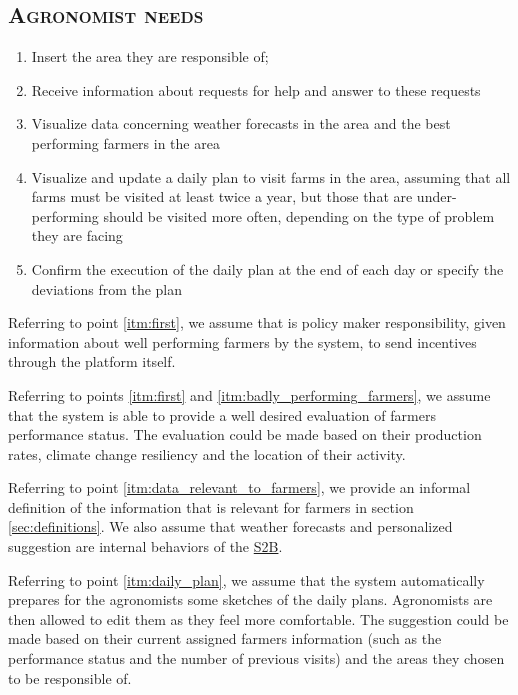 \subsection*{\textsc{\textcolor{myblue}{Agronomist needs}}}
\label{sec:agronomistsNeeds}
    \begin{enumerate}[resume]
        \item Insert the area they are responsible of;
        \item Receive information about requests for help and answer to these requests
        \item Visualize data concerning weather forecasts in the area and the best performing farmers in the area
        \item \label{itm:daily_plan} Visualize and update a daily plan to visit farms in the area, assuming that all farms must be visited at least twice a year, but those that are under-performing should be visited more often, depending on the type of problem they are facing
        \item Confirm the execution of the daily plan at the end of each day or specify the deviations from the plan
    \end{enumerate}

Referring to point \ref{itm:first}, we assume that is policy maker responsibility, given information about well performing farmers by the system, to send incentives through the platform itself. 
\newline

Referring to points \ref{itm:first} and \ref{itm:badly_performing_farmers}, we assume that the system is able to provide a well desired evaluation of farmers performance status. The evaluation could be made based on their production rates, climate change resiliency and the location of their activity.
\newline

Referring to point \ref{itm:data_relevant_to_farmers}, we provide an informal definition of the information that is relevant for farmers in section \ref{sec:definitions}. We also assume that weather forecasts and personalized suggestion are internal behaviors of the \hyperref[tab:acronymsTable]{S2B}.
\newline

Referring to point \ref{itm:daily_plan}, we assume that the system automatically prepares for the agronomists some sketches of the daily plans. Agronomists are then allowed to edit them as they feel more comfortable.
The suggestion could be made based on their current assigned farmers information (such as the performance status and the number of previous visits) and the areas they chosen to be responsible of.
\newline

